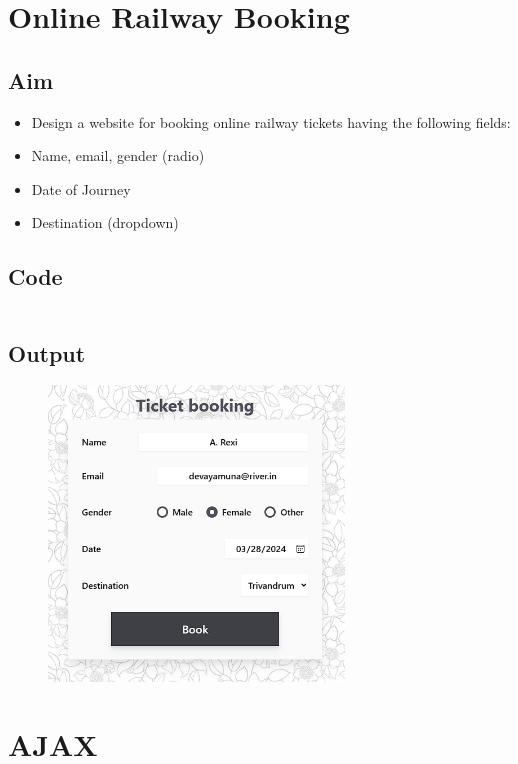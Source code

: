 \documentclass{article}
\begin{document}
\section{Online Railway Booking}
\subsection{Aim}
\begin{itemize}
  \item Design a website for booking online railway tickets having the following fields:
  \item Name, email, gender (radio)
  \item Date of Journey 
  \item Destination (dropdown)
\end{itemize}

\subsection{Code}
\inputminted[frame=lines, breaklines, breakanywhere, numberblanklines=false]{html}{./prog_19/index.html}

\newpage
\subsection{Output}
\begin{figure}[h!]
	\centering
	\includegraphics[width=0.7\textwidth]{./Assets/p19.png}
\end{figure}
\newpage

\section{AJAX}
\end{document}
